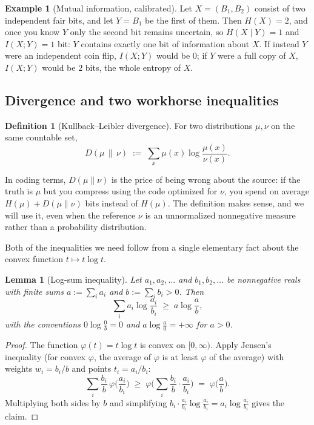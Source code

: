 \documentclass[10pt]{article}
\newtheorem{lemma}[theorem]{Lemma}
\theoremstyle{definition}
\newtheorem{definition}[theorem]{Definition}
\newtheorem{example}[theorem]{Example}
\theoremstyle{remark}
\begin{document}
\begin{example}[Mutual information, calibrated]
Let $X = (B_1, B_2)$ consist of two independent fair bits, and let $Y = B_1$ be the first of them. Then $H(X) = 2$, and once you know $Y$ only the second bit remains uncertain, so $H(X \mid Y) = 1$ and $I(X;Y) = 1$ bit: $Y$ contains exactly one bit of information about $X$. If instead $Y$ were an independent coin flip, $I(X;Y)$ would be $0$; if $Y$ were a full copy of $X$, $I(X;Y)$ would be $2$ bits, the whole entropy of $X$.
\end{example}

\subsection{Divergence and two workhorse inequalities}

\begin{definition}[Kullback--Leibler divergence]
For two distributions $\mu, \nu$ on the same countable set,
\[
D(\mu \,\|\, \nu) \;:=\; \sum_x \mu(x) \log \frac{\mu(x)}{\nu(x)} .
\]
\end{definition}

In coding terms, $D(\mu \| \nu)$ is the price of being wrong about the source: if the truth is $\mu$ but you compress using the code optimized for $\nu$, you spend on average $H(\mu) + D(\mu\|\nu)$ bits instead of $H(\mu)$. The definition makes sense, and we will use it, even when the reference $\nu$ is an unnormalized nonnegative measure rather than a probability distribution.

Both of the inequalities we need follow from a single elementary fact about the convex function $t \mapsto t \log t$.

\begin{lemma}[Log-sum inequality]
\label{lem:logsum}
Let $a_1, a_2, \dots$ and $b_1, b_2, \dots$ be nonnegative reals with finite sums $a := \sum_i a_i$ and $b := \sum_i b_i > 0$. Then
\[
\sum_i a_i \log \frac{a_i}{b_i} \;\ge\; a \log \frac{a}{b},
\]
with the conventions $0 \log \frac{0}{b} = 0$ and $a \log \frac{a}{0} = +\infty$ for $a > 0$.
\end{lemma}

\begin{proof}
The function $\varphi(t) = t \log t$ is convex on $[0, \infty)$. Apply Jensen's inequality (for convex $\varphi$, the average of $\varphi$ is at least $\varphi$ of the average) with weights $w_i = b_i / b$ and points $t_i = a_i / b_i$:
\[
\sum_i \frac{b_i}{b}\, \varphi\!\Big(\frac{a_i}{b_i}\Big) \;\ge\; \varphi\!\Big(\sum_i \frac{b_i}{b} \cdot \frac{a_i}{b_i}\Big) \;=\; \varphi\!\Big(\frac{a}{b}\Big).
\]
Multiplying both sides by $b$ and simplifying $b_i \cdot \frac{a_i}{b_i}\log\frac{a_i}{b_i} = a_i \log \frac{a_i}{b_i}$ gives the claim.
\end{proof}
\end{document}
